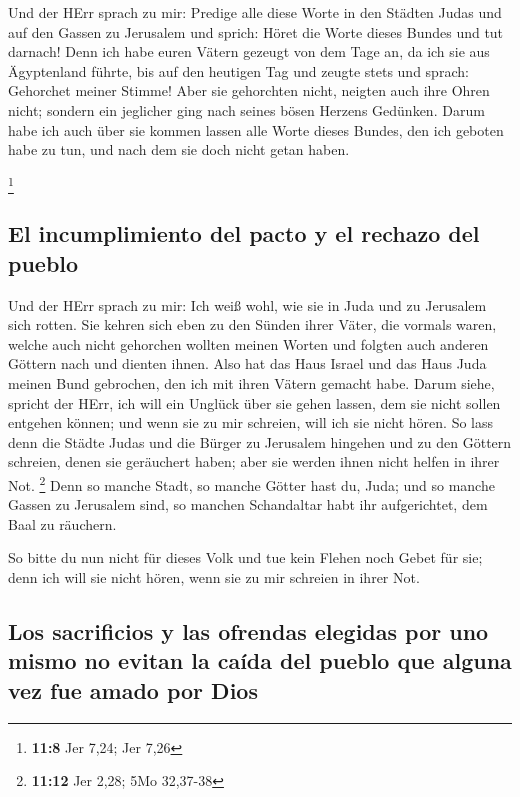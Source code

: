  Und der HErr sprach zu mir: Predige alle diese Worte in
den Städten Judas und auf den Gassen zu Jerusalem und sprich: Höret die
Worte dieses Bundes und tut darnach!  Denn ich habe euren
Vätern gezeugt von dem Tage an, da ich sie aus Ägyptenland führte, bis
auf den heutigen Tag und zeugte stets und sprach: Gehorchet meiner
Stimme!  Aber sie gehorchten nicht, neigten auch ihre
Ohren nicht; sondern ein jeglicher ging nach seines bösen Herzens
Gedünken. Darum habe ich auch über sie kommen lassen alle Worte dieses
Bundes, den ich geboten habe zu tun, und nach dem sie doch nicht getan
haben.

\footnote{\textbf{11:8} Jer 7,24; Jer 7,26}

\hypertarget{el-incumplimiento-del-pacto-y-el-rechazo-del-pueblo}{%
\subsection{El incumplimiento del pacto y el rechazo del
pueblo}\label{el-incumplimiento-del-pacto-y-el-rechazo-del-pueblo}}

 Und der HErr sprach zu mir: Ich weiß wohl, wie sie in
Juda und zu Jerusalem sich rotten.  Sie kehren sich eben
zu den Sünden ihrer Väter, die vormals waren, welche auch nicht
gehorchen wollten meinen Worten und folgten auch anderen Göttern nach
und dienten ihnen. Also hat das Haus Israel und das Haus Juda meinen
Bund gebrochen, den ich mit ihren Vätern gemacht habe. 
Darum siehe, spricht der HErr, ich will ein Unglück über sie gehen
lassen, dem sie nicht sollen entgehen können; und wenn sie zu mir
schreien, will ich sie nicht hören.  So lass denn die
Städte Judas und die Bürger zu Jerusalem hingehen und zu den Göttern
schreien, denen sie geräuchert haben; aber sie werden ihnen nicht helfen
in ihrer Not. \footnote{\textbf{11:12} Jer 2,28; 5Mo 32,37-38}
 Denn so manche Stadt, so manche Götter hast du, Juda;
und so manche Gassen zu Jerusalem sind, so manchen Schandaltar habt ihr
aufgerichtet, dem Baal zu räuchern.

 So bitte du nun nicht für dieses Volk und tue kein
Flehen noch Gebet für sie; denn ich will sie nicht hören, wenn sie zu
mir schreien in ihrer Not.

\hypertarget{los-sacrificios-y-las-ofrendas-elegidas-por-uno-mismo-no-evitan-la-cauxedda-del-pueblo-que-alguna-vez-fue-amado-por-dios}{%
\subsection{Los sacrificios y las ofrendas elegidas por uno mismo no
evitan la caída del pueblo que alguna vez fue amado por
Dios}\label{los-sacrificios-y-las-ofrendas-elegidas-por-uno-mismo-no-evitan-la-cauxedda-del-pueblo-que-alguna-vez-fue-amado-por-dios}}

